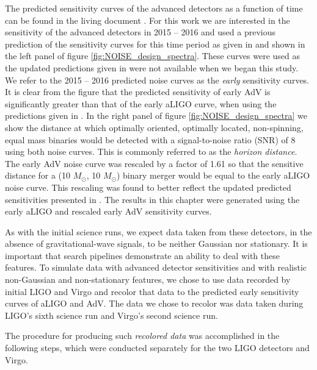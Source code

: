 The predicted sensitivity curves of the advanced detectors as a function of
time can be found in the living document
\cite{Aasi:2013wya}. For this work we are interested in the
sensitivity of the advanced detectors in 2015 -- 2016 and used a previous 
prediction of the sensitivity curves for this time period as given in
\cite{LV_early_noisecurves} and shown in the left panel of figure 
\ref{fig:NOISE_design_spectra}.
These curves were used as the updated predictions given in 
\cite{Aasi:2013wya} were not available when we began this study.
We refer to the 2015 -- 2016 predicted noise curves as the \emph{early} 
sensitivity curves.
It is clear from the figure that the predicted
sensitivity of early AdV is significantly greater than 
that of the early aLIGO curve, when using the predictions given in 
\cite{LV_early_noisecurves}. In the right panel of figure 
\ref{fig:NOISE_design_spectra} we
show the distance at which optimally oriented, optimally located,
non-spinning, equal mass binaries would be detected with a
signal-to-noise ratio (SNR) of 8 using both noise curves.
This is commonly referred to as the \emph{horizon distance}. The early AdV 
noise curve was rescaled
by a factor of 1.61 so that the sensitive distance for a
(10 $M_{\odot}$, 10 $M_{\odot}$) binary merger would be equal to the early aLIGO
noise curve. This rescaling was found to better reflect the updated predicted
sensitivities presented in \cite{Aasi:2013wya}. The results in this 
chapter were generated using the early aLIGO and rescaled early AdV sensitivity 
curves.

As with the initial science runs, we expect data taken from
these detectors, in the absence of gravitational-wave signals, to be neither
Gaussian nor stationary. It is important that search pipelines demonstrate
an ability to deal with these features. To simulate data with 
advanced detector sensitivities and with
realistic non-Gaussian and non-stationary features, we chose to use
data recorded by initial LIGO and Virgo and recolor that data to the
predicted early sensitivity curves of aLIGO and AdV. The data we
chose to recolor was data taken during LIGO's sixth science run and Virgo's
second science run.

The procedure for producing such \emph{recolored data} was accomplished in the
following steps, which were conducted separately for the two LIGO detectors and
Virgo.

